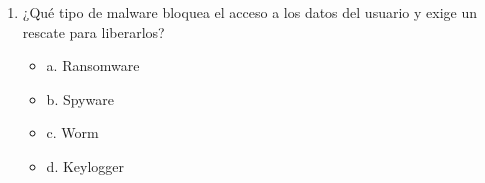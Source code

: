 \documentclass[a4paper]{article}
\begin{document}
\begin{enumerate}
    \item ¿Qué tipo de malware bloquea el acceso a los datos del usuario y exige un rescate para liberarlos? 
    \begin{itemize}
        \item a. Ransomware
        \item b. Spyware
        \item c. Worm
        \item d. Keylogger
    \end{itemize}
    
    
    

\end{enumerate}
\end{document}
